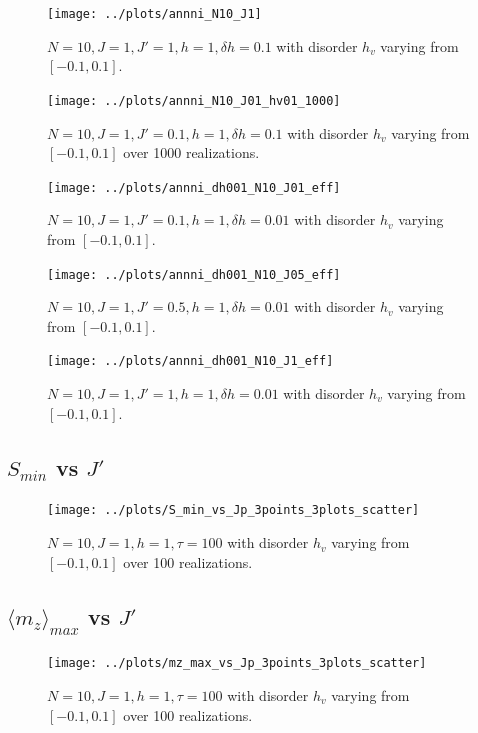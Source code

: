 \documentclass[a4paper]{article}
\begin{document}
\begin{figure}[h!]
  \centering
  \texttt{[image: ../plots/annni\_N10\_J1]}
  \caption{$N = 10, J = 1, J'=1, h = 1, \delta h = 0.1$ with disorder $h_v$ varying from $[-0.1,0.1]$.}
  \label{fig:}
\end{figure}

\begin{figure}[h!]
  \centering
  \texttt{[image: ../plots/annni\_N10\_J01\_hv01\_1000]}
  \caption{$N = 10, J = 1, J'=0.1, h = 1, \delta h = 0.1$ with disorder $h_v$ varying from $[-0.1,0.1]$ over 1000 realizations.}
  \label{fig:}
\end{figure}

\begin{figure}[h!]
  \centering
  \texttt{[image: ../plots/annni\_dh001\_N10\_J01\_eff]}
  \caption{$N = 10, J = 1, J'=0.1, h = 1, \delta h = 0.01$ with disorder $h_v$ varying from $[-0.1,0.1]$.}
  \label{fig:}
\end{figure}

\begin{figure}[h!]
  \centering
  \texttt{[image: ../plots/annni\_dh001\_N10\_J05\_eff]}
  \caption{$N = 10, J = 1, J'=0.5, h = 1, \delta h = 0.01$ with disorder $h_v$ varying from $[-0.1,0.1]$.}
  \label{fig:}
\end{figure}

\begin{figure}[h!]
  \centering
  \texttt{[image: ../plots/annni\_dh001\_N10\_J1\_eff]}
  \caption{$N = 10, J = 1, J'=1, h = 1, \delta h = 0.01$ with disorder $h_v$ varying from $[-0.1,0.1]$.}
  \label{fig:}
\end{figure}

\subsection{$S_{min}$ vs $J'$}
\begin{figure}[h!]
  \centering
  \texttt{[image: ../plots/S\_min\_vs\_Jp\_3points\_3plots\_scatter]}
  \caption{$N = 10, J = 1, h = 1, \tau=100$ with disorder $h_v$ varying from $[-0.1,0.1]$ over 100 realizations.}
  \label{fig:}
\end{figure}

\subsection{$\langle m_z \rangle_{max}$ vs $J'$}
\begin{figure}[h!]
  \centering
  \texttt{[image: ../plots/mz\_max\_vs\_Jp\_3points\_3plots\_scatter]}
  \caption{$N = 10, J = 1, h = 1, \tau=100$ with disorder $h_v$ varying from $[-0.1,0.1]$ over 100 realizations.}
  \label{fig:}
\end{figure}
\end{document}
